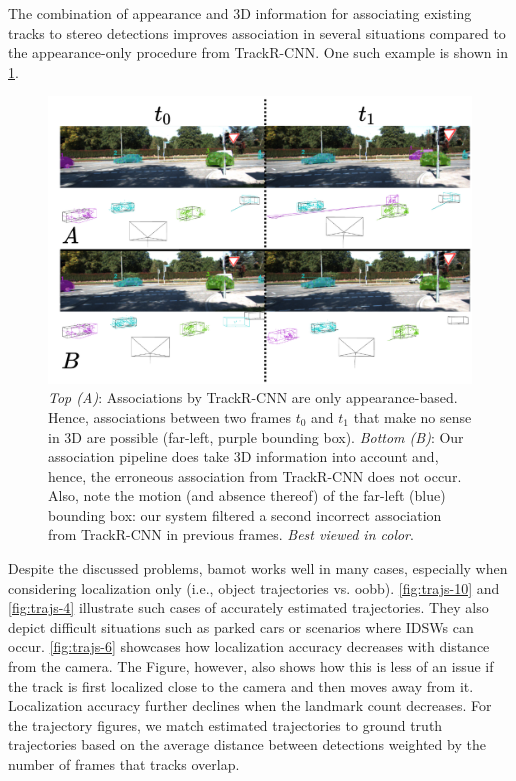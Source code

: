 \documentclass[headsepline, hidelinks, footsepline, footinclude=false, oneside, fontsize=11pt, paper=a4, listof=totoc, bibliography=totoc]{scrbook}
\begin{document}
The combination of appearance and 3D information for associating existing tracks to stereo detections improves association in several situations compared to the appearance-only procedure from TrackR-CNN.
One such example is shown in \cref{fig:improved-tracking}.

\begin{figure}[htbp]
\centering
\includegraphics[width=\textwidth]{figures/improved-tracking.pdf}
\caption{\label{fig:improved-tracking}\emph{Top (A)}: Associations by TrackR-CNN are only appearance-based. Hence, associations between two frames \(t_0\) and \(t_1\) that make no sense in 3D are possible (far-left, purple bounding box). \emph{Bottom (B)}: Our association pipeline does take 3D information into account and, hence, the erroneous association from TrackR-CNN does not occur. Also, note the motion (and absence thereof) of the far-left (blue) bounding box: our system filtered a second incorrect association from TrackR-CNN in previous frames. \emph{Best viewed in color}.}
\end{figure}

Despite the discussed problems, \gls{bamot} works well in many cases, especially when considering localization only (i.e., object trajectories vs. \gls{oobb}). 
\cref{fig:trajs-10} and \cref{fig:trajs-4} illustrate such cases of accurately estimated trajectories. 
They also depict difficult situations such as parked cars or scenarios where IDSWs can occur.
\cref{fig:trajs-6} showcases how localization accuracy decreases with distance from the camera. The Figure, however, also shows how this is less of an issue if the track
is first localized close to the camera and then moves away from it.
Localization accuracy further declines when the landmark count decreases. 
For the trajectory figures, we match estimated trajectories to ground truth trajectories based on the average distance between detections weighted by the number of frames that tracks overlap.
\end{document}
